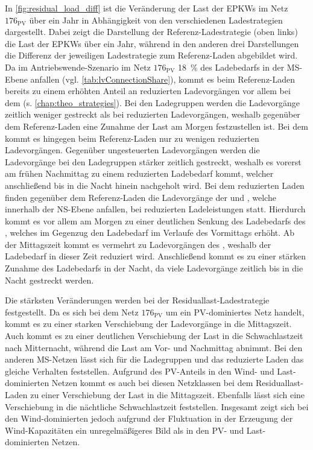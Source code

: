 

In \autoref{fig:residual_load_diff} ist die Veränderung der Last der \glspl{EPKW} im Netz \(176_{\text{PV}}\) über ein Jahr in Abhängigkeit von den verschiedenen Ladestrategien dargestellt.
Dabei zeigt die Darstellung der Referenz-Ladestrategie (oben links) die Last der \glspl{EPKW} über ein Jahr, während in den anderen drei Darstellungen die Differenz der jeweiligen Ladestrategie zum Referenz-Laden abgebildet wird.
Da im Antriebswende-Szenario im Netz \(176_{\text{PV}}\) \SI{18}{\percent} des Ladebedarfs in der \gls{MS}-Ebene anfallen (vgl. \autoref{tab:lvConnectionShare}), kommt es beim Referenz-Laden bereits zu einem erhöhten Anteil an reduzierten Ladevorgängen vor allem bei dem \UC \Firmeparkplatz (s. \autoref{chap:theo_strategies}).
Bei den Ladegruppen werden die Ladevorgänge zeitlich weniger gestreckt als bei reduzierten Ladevorgängen, weshalb gegenüber dem Referenz-Laden eine Zunahme der Last am Morgen festzustellen ist.
Bei dem \UC \zH kommt es hingegen beim Referenz-Laden nur zu wenigen reduzierten Ladevorgängen.
Gegenüber ungesteuerten Ladevorgängen werden die Ladevorgänge bei den Ladegruppen stärker zeitlich gestreckt, weshalb es vorerst am frühen Nachmittag zu einem reduzierten Ladebedarf kommt, welcher anschließend bis in die Nacht hinein nachgeholt wird.
Bei dem reduzierten Laden finden gegenüber dem Referenz-Laden die Ladevorgänge der \UCs \zH und \Firmeparkplatzdot, welche innerhalb der \gls{NS}-Ebene anfallen, bei reduzierten Ladeleistungen statt.
Hierdurch kommt es vor allem am Morgen zu einer deutlichen Senkung des Ladebedarfs des \UCs \Firmeparkplatzdot, welches im Gegenzug den Ladebedarf im Verlaufe des Vormittags erhöht.
Ab der Mittagszeit kommt es vermehrt zu Ladevorgängen des \UCs \zHdot, weshalb der Ladebedarf in dieser Zeit reduziert wird.
Anschließend kommt es zu einer stärken Zunahme des Ladebedarfs in der Nacht, da viele Ladevorgänge zeitlich bis in die Nacht gestreckt werden.



Die stärksten Veränderungen werden bei der Residuallast-Ladestrategie festgestellt.
Da es sich bei dem Netz \(176_{\text{PV}}\) um ein \gls{PV}-dominiertes Netz handelt, kommt es zu einer starken Verschiebung der Ladevorgänge in die Mittagszeit.
Auch kommt es zu einer deutlichen Verschiebung der Last in die Schwachlastzeit nach Mitternacht, während die Last am Vor- und Nachmittag abnimmt.
Bei den anderen \gls{MS}-Netzen lässt sich für die Ladegruppen und das reduzierte Laden das gleiche Verhalten feststellen.
Aufgrund des \gls{PV}-Anteils in den Wind- und Last-dominierten Netzen kommt es auch bei diesen Netzklassen bei dem Residuallast-Laden zu einer Verschiebung der Last in die Mittagszeit.
Ebenfalls lässt sich eine Verschiebung in die nächtliche Schwachlastzeit feststellen.
Insgesamt zeigt sich bei den Wind-dominierten jedoch aufgrund der Fluktuation in der Erzeugung der Wind-Kapazitäten ein unregelmäßigeres Bild als in den \gls{PV}- und Last-dominierten Netzen.


